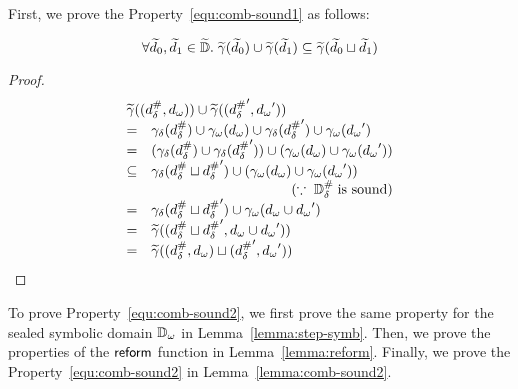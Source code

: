 First, we prove the Property~\ref{equ:comb-sound1} as follows:
\begin{lemma}
  \[
    \forall \widetilde{d}_0, \widetilde{d}_1 \in \widetilde{\mathbb{D}}. \; \widetilde{\gamma}(\widetilde{d}_0) \cup
    \widetilde{\gamma}(\widetilde{d}_1) \subseteq \widetilde{\gamma}(\widetilde{d}_0 \sqcup \widetilde{d}_1)
  \]
\end{lemma}
\begin{proof}
  \[
    \begin{array}{cl}
      \multicolumn{2}{l}{
        \combgamma((\sabselem, \symbelem)) \cup \combgamma((\sabselem', \symbelem'))
      }\\
      =& \sgamma(\sabselem) \cup \symbgamma(\symbelem)
      \cup \sgamma(\sabselem') \cup \symbgamma(\symbelem')\\
      =& (\sgamma(\sabselem)\cup \sgamma(\sabselem'))
      \cup (\symbgamma(\symbelem) \cup \symbgamma(\symbelem'))\\
      \subseteq& \sgamma(\sabselem \join \sabselem')
      \cup (\symbgamma(\symbelem) \cup \symbgamma(\symbelem'))\\
      & \multicolumn{1}{r}{(\because \; \sabsdom \; \text{is sound})}\\
      =& \sgamma(\sabselem \join \sabselem')
      \cup \symbgamma(\symbelem \cup \symbelem')\\
      =& \combgamma((\sabselem \join \sabselem', \symbelem \cup \symbelem'))\\
      =& \combgamma((\sabselem, \symbelem) \join (\sabselem', \symbelem'))\\
    \end{array}
  \]
\end{proof}

To prove Property~\ref{equ:comb-sound2}, we first prove the same property for
the sealed symbolic domain ${\mathbb{D}}_\omega$ in Lemma~\ref{lemma:step-symb}.  Then, we
prove the properties of the $\textsf{reform}$ function in Lemma~\ref{lemma:reform}.
Finally, we prove the Property~\ref{equ:comb-sound2} in
Lemma~\ref{lemma:comb-sound2}.

